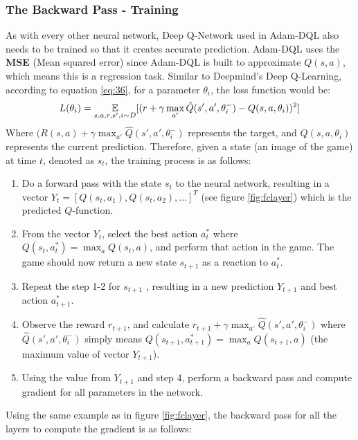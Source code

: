         \subsubsection{The Backward Pass - Training}
        As with every other neural network, Deep Q-Network used in Adam-DQL also needs to be trained so that it creates accurate prediction. Adam-DQL uses the \textbf{MSE} (Mean squared error) since Adam-DQL is built to approximate $Q(s,a)$, which means this is a regression task. Similar to Deepmind's Deep Q-Learning, according to equation \ref{eq:36}, for a parameter $\theta_i$, the loss function would be:
        \begin{equation*}
            L(\theta_i)=\operatorname*{\mathbb{E}}_{s,a,r,s',i \sim D}[(r+\gamma \max_{a'}\hat{Q}(s',a',\theta_i^-)-Q(s,a,\theta_i))^2]
        \end{equation*}
        Where $(R(s,a)+\gamma \max_{a'}\hat{Q}(s',a',\theta_i^-)$ represents the target, and $Q(s,a,\theta_i)$ represents the current prediction. Therefore, given a state (an image of the game) at time $t$, denoted as $s_t$, the training process is as follows:
        \begin{enumerate}
            \item Do a forward pass with the state $s_t$ to the neural network, resulting in a vector $Y_t=[Q(s_t,a_1),Q(s_t,a_2),...]^T$ (see figure \ref{fig:fclayer}) which is the predicted $Q$-function.
            \item From the vector $Y_t$, select the best action $a^*_t$ where $Q(s_t,a^*_t)=\max_a Q(s_t,a)$, and perform that action in the game. The game should now return a new state $s_{t+1}$ as a reaction to $a^*_t$.
            \item Repeat the step 1-2 for $s_{t+1}$ , resulting in a new prediction $Y_{t+1}$ and best action $a^*_{t+1}$.
            \item Observe the reward $r_{t+1}$, and calculate $r_{t+1}+\gamma \max_{a'}\hat{Q}(s',a',\theta_i^-)$ where $\hat{Q}(s',a',\theta_i^-)$ simply means $Q(s_{t+1},a^*_{t+1})=\max_a Q(s_{t+1},a)$ (the maximum value of vector $Y_{t+1}$).
            \item Using the value from $Y_{t+1}$ and step 4, perform a backward pass and compute gradient for all parameters in the network.
        \end{enumerate}
        Using the same example as in figure \ref{fig:fclayer}, the backward pass for all the layers to compute the gradient is as follows:
